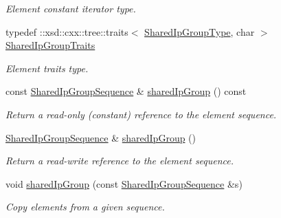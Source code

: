 \begin{DoxyCompactItemize}
\begin{DoxyCompactList}\small\item\em Element constant iterator type. \item\end{DoxyCompactList}\item 
\hypertarget{classopenstack_1_1xml_1_1SharedIpGroups_a2832d73cff6c46b889352d3b464e85b5}{
typedef ::xsd::cxx::tree::traits$<$ \hyperlink{classopenstack_1_1xml_1_1SharedIpGroup}{SharedIpGroupType}, char $>$ \hyperlink{classopenstack_1_1xml_1_1SharedIpGroups_a2832d73cff6c46b889352d3b464e85b5}{SharedIpGroupTraits}}
\label{classopenstack_1_1xml_1_1SharedIpGroups_a2832d73cff6c46b889352d3b464e85b5}

\begin{DoxyCompactList}\small\item\em Element traits type. \item\end{DoxyCompactList}\item 
const \hyperlink{classopenstack_1_1xml_1_1SharedIpGroups_af021b83d8e3b8876b2aecc2c476e39e2}{SharedIpGroupSequence} \& \hyperlink{classopenstack_1_1xml_1_1SharedIpGroups_a87befa4b9dd7f3d76766d65d537df4ce}{sharedIpGroup} () const 
\begin{DoxyCompactList}\small\item\em Return a read-\/only (constant) reference to the element sequence. \item\end{DoxyCompactList}\item 
\hyperlink{classopenstack_1_1xml_1_1SharedIpGroups_af021b83d8e3b8876b2aecc2c476e39e2}{SharedIpGroupSequence} \& \hyperlink{classopenstack_1_1xml_1_1SharedIpGroups_a5faa03e38a7e1a571b5e2a1fee61cc96}{sharedIpGroup} ()
\begin{DoxyCompactList}\small\item\em Return a read-\/write reference to the element sequence. \item\end{DoxyCompactList}\item 
void \hyperlink{classopenstack_1_1xml_1_1SharedIpGroups_ab9abf01851eea9df1f3310b6ea72ab37}{sharedIpGroup} (const \hyperlink{classopenstack_1_1xml_1_1SharedIpGroups_af021b83d8e3b8876b2aecc2c476e39e2}{SharedIpGroupSequence} \&s)
\begin{DoxyCompactList}\small\item\em Copy elements from a given sequence. \item\end{DoxyCompactList}\end{DoxyCompactItemize}
